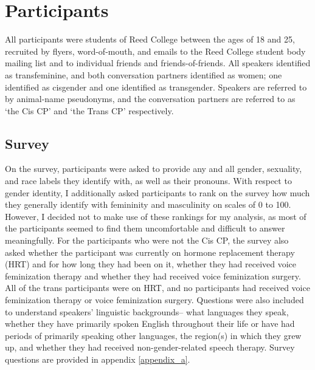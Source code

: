 \documentclass[12pt,twoside]{reedthesis}
\begin{document}
\section{Participants}
All participants were students of Reed College between the ages of 18 and 25, recruited by flyers, word-of-mouth, and emails to the Reed College student body mailing list and to individual friends and friends-of-friends. All speakers identified as transfeminine, and both conversation partners identified as women; one identified as cisgender and one identified as transgender. Speakers are referred to by animal-name pseudonyms, and the conversation partners are referred to as `the Cis CP' and `the Trans CP' respectively.

\subsection{Survey}
On the survey, participants were asked to provide any and all gender, sexuality, and race labels they identify with, as well as their pronouns. With respect to gender identity, I additionally asked participants to rank on the survey how much they generally identify with femininity and masculinity on scales of 0 to 100. However, I decided not to make use of these rankings for my analysis, as most of the participants seemed to find them uncomfortable and difficult to answer meaningfully. For the participants who were not the Cis CP, the survey also asked whether the participant was currently on hormone replacement therapy (HRT) and for how long they had been on it, whether they had received voice feminization therapy and whether they had received voice feminization surgery. All of the trans participants were on HRT, and no participants had received voice feminization therapy or voice feminization surgery. Questions were also included to understand speakers' linguistic backgrounds-- what languages they speak, whether they have primarily spoken English throughout their life or have had periods of primarily speaking other languages, the region(s) in which they grew up, and whether they had received non-gender-related speech therapy. Survey questions are provided in appendix \ref{appendix_a}.
\end{document}
